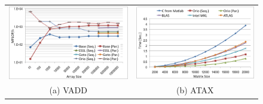 \documentclass[runningheads]{llncs}
\begin{document}
\begin{figure}[htp]
{\small
\centering
\begin{tabular}{cc}

\begin{minipage}[b]{.5\textwidth}
\includegraphics[width=\textwidth]{figures/vadd_bgp.png}
\end{minipage}
&
\begin{minipage}[b]{.5\textwidth}
\includegraphics[width=\textwidth]{figures/atax.png}
\end{minipage}\\

(a) VADD & (b) ATAX \\


\end{tabular}}
\end{figure}
\end{document}
